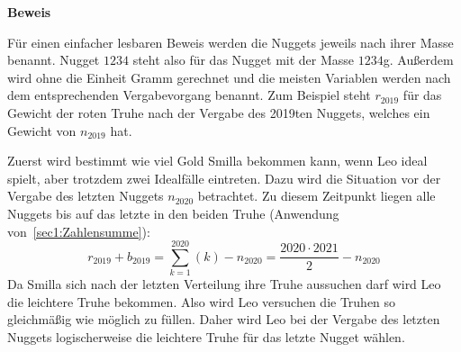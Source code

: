\documentclass[10pt, a4paper, reqno]{amsart}
\makeatletter
\renewcommand\proofname{Beweis}
\renewenvironment{proof}[1][\proofname]{\par
\pushQED{\qed}%
\normalfont \topsep6\p@\@plus6\p@\relax
\trivlist
\item\relax
{\bfseries#1}\hspace\labelsep\ignorespaces
}{%
\popQED\endtrivlist\@endpefalse
}
\makeatother
\begin{document}
\begin{proof}
  Für einen einfacher lesbaren Beweis werden die Nuggets jeweils nach ihrer
  Masse benannt. Nugget $1234$ steht also für das Nugget mit der Masse $1234$g.
  Außerdem wird ohne die Einheit Gramm gerechnet und die meisten Variablen werden nach dem entsprechenden Vergabevorgang benannt.
  Zum Beispiel steht $r_{2019}$ für das Gewicht der roten Truhe nach der Vergabe
  des 2019ten Nuggets, welches ein Gewicht von $n_{2019}$ hat.
  
  Zuerst wird bestimmt wie viel Gold Smilla bekommen kann, wenn Leo ideal
  spielt, aber trotzdem zwei Idealfälle eintreten. Dazu wird die Situation vor
  der Vergabe des letzten Nuggets $n_{2020}$ betrachtet. Zu diesem Zeitpunkt
  liegen alle Nuggets bis auf das letzte in den beiden Truhe (Anwendung
  von~\autoref{sec1:Zahlensumme}):
  \begin{equation}\label{sec1:equation1}
    r_{2019}+b_{2019}=\sum_{k=1}^{2020}\left(k\right)-n_{2020}=\frac{2020\cdot2021}{2}-n_{2020}
  \end{equation}
  Da Smilla sich nach der letzten Verteilung ihre Truhe aussuchen darf
  wird Leo die leichtere Truhe bekommen. Also wird Leo versuchen die Truhen so
  gleichmäßig wie möglich zu füllen. Daher wird Leo bei der Vergabe des letzten
  Nuggets logischerweise die leichtere Truhe für das letzte Nugget wählen.


\end{proof}
\end{document}
